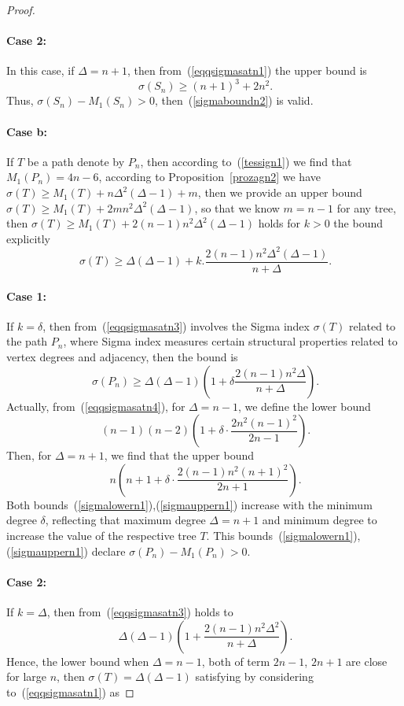 \documentclass[12pt]{amsart}
\newcommand{\case}[1]{\paragraph*{Case #1:}}
\begin{document}
\begin{proof}
\case{2} In this case, if $\Delta=n+1$, then from~(\ref{eqqsigmasatn1}) the upper bound is 
\begin{equation}~\label{eqqsigmasatn2}
\sigma(S_n) \geq (n+1)^3+2n^2.
\end{equation}
Thus, $\sigma(S_n)-M_1(S_n)>0$, then~(\ref{sigmaboundn2}) is valid.
\case{b} If $T$ be a path denote by $P_n$, then according to~(\ref{tessign1}) we find that $ M_1(P_n) = 4n - 6$, according to Proposition~\ref{prozagn2} we have $\sigma(T)\geq M_1(T)+n\Delta^2(\Delta-1)+m$, then we provide an upper bound $\sigma(T)\geq M_1(T)+2mn^2\Delta^2(\Delta-1)$, so that we know $m=n-1$ for any tree, then $\sigma(T)\geq M_1(T)+2(n-1)n^2\Delta^2(\Delta-1)$ holds for $k>0$ the bound explicitly
\begin{equation}~\label{eqqsigmasatn3}
\sigma(T)\geq \Delta(\Delta-1)+k.\frac{2(n-1)n^2\Delta^2(\Delta-1)}{n+\Delta}.
\end{equation}
\case{1} If $k=\delta$, then from~(\ref{eqqsigmasatn3}) involves the Sigma index $\sigma(T)$ related to the path $P_n$, where Sigma index measures certain structural properties related to vertex degrees and adjacency, then the bound is 
\begin{equation}~\label{eqqsigmasatn4}
\sigma(P_n)\geq \Delta(\Delta-1)\left (1+\delta\frac{2(n-1)n^2\Delta}{n+\Delta}\right).
\end{equation}
Actually, from~(\ref{eqqsigmasatn4}), for $\Delta=n-1$, we define the lower bound
\begin{equation}~\label{sigmalowern1}
    (n - 1)(n - 2) \left( 1 + \delta \cdot \frac{2 n^{2} (n - 1)^{2}}{2 n - 1} \right).
\end{equation}
Then, for $\Delta=n+1$, we find that the upper bound 
\begin{equation}~\label{sigmauppern1}
    n \left( n + 1 + \delta \cdot \frac{2 (n - 1) n^{2} (n + 1)^{2}}{2 n + 1} \right).
\end{equation}
Both bounds~(\ref{sigmalowern1}),(\ref{sigmauppern1}) increase with the minimum degree $\delta$, reflecting that maximum degree $\Delta=n+1$ and minimum degree to increase the value of the respective tree $T$. This bounds~(\ref{sigmalowern1}),(\ref{sigmauppern1}) declare $\sigma(P_n)-M_1(P_n)>0$. 
\case{2} If $k=\Delta$, then from~(\ref{eqqsigmasatn3}) holds to 
\begin{equation}~\label{eqqsigmasatn5}
    \Delta (\Delta - 1) \left( 1 + \frac{2 (n - 1) n^{2} \Delta^{2}}{n + \Delta} \right).
\end{equation}
Hence, the lower bound when $\Delta=n-1$, both of term $2n-1$, $2n+1$ are close for large $n$, then $\sigma(T)= \Delta (\Delta - 1)$ satisfying by considering to~(\ref{eqqsigmasatn1}) as 

\end{proof}
\end{document}
